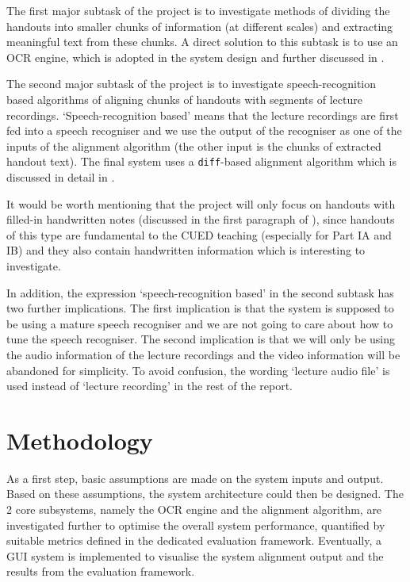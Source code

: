 The first major subtask of the project is to investigate methods of dividing the handouts into smaller chunks of information (at different scales) and extracting meaningful text from these chunks. A direct solution to this subtask is to use an OCR engine, which is adopted in the system design and further discussed in .

The second major subtask of the project is to investigate speech-recognition based algorithms of aligning chunks of handouts with segments of lecture recordings. `Speech-recognition based' means that the lecture recordings are first fed into a speech recogniser and we use the output of the recogniser as one of the inputs of the alignment algorithm (the other input is the chunks of extracted handout text). The final system uses a \texttt{diff}-based alignment algorithm which is discussed in detail in .

It would be worth mentioning that the project will only focus on handouts with filled-in handwritten notes (discussed in the first paragraph of ), since handouts of this type are fundamental to the CUED teaching (especially for Part IA and IB) and they also contain handwritten information which is interesting to investigate. 

In addition, the expression `speech-recognition based' in the second subtask has two further implications. The first implication is that the system is supposed to be using a mature speech recogniser and we are not going to care about how to tune the speech recogniser. The second implication is that we will only be using the audio information of the lecture recordings and the video information will be abandoned for simplicity. To avoid confusion, the wording `lecture audio file' is used instead of `lecture recording' in the rest of the report.

\section{Methodology}

As a first step, basic assumptions are made on the system inputs and output. Based on these assumptions, the system architecture could then be designed. The 2 core subsystems, namely the OCR engine and the alignment algorithm, are investigated further to optimise the overall system performance, quantified by suitable metrics defined in the dedicated evaluation framework. Eventually, a GUI system is implemented to visualise the system alignment output and the results from the evaluation framework.

